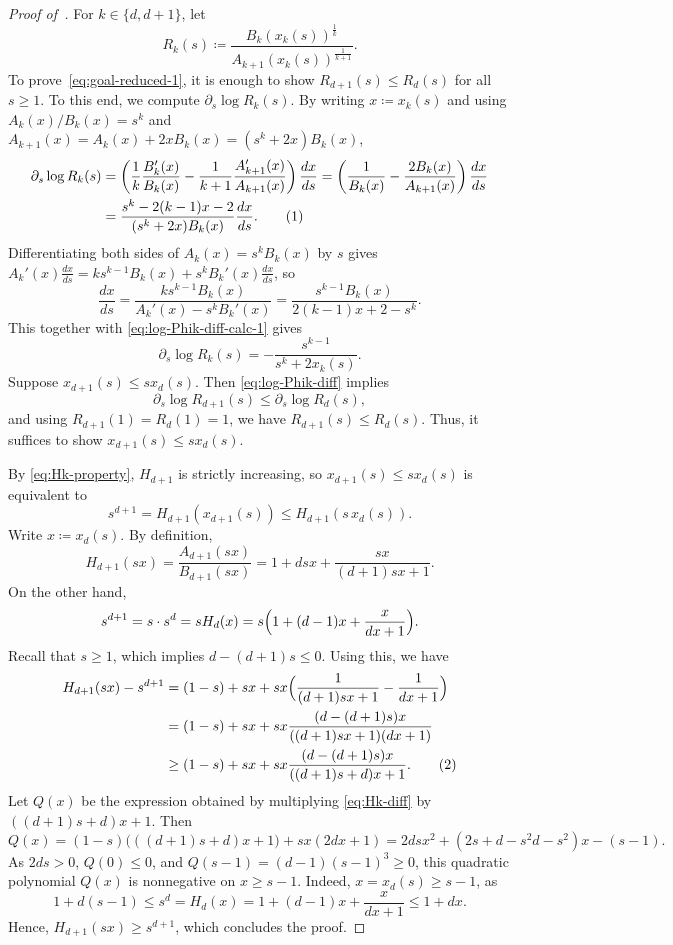 \documentclass{article}
\numberwithin{equation}{section}
\newcommand\numberthis{\addtocounter{equation}{1}\tag{\theequation}}
\theoremstyle{plain}
\theoremstyle{definition}
\theoremstyle{remark} %
\newcommand{\defeq}{\coloneqq}
\begin{document}
\begin{proof}[Proof of~]
For \(k\in\{d,d+1\}\), let
\[
    R_k(s) \defeq \frac{B_k(x_k(s))^{\frac{1}{k}}}{A_{k+1}(x_k(s))^{\frac{1}{k+1}}}.
\]
To prove~\eqref{eq:goal-reduced-1}, it is enough to show \(R_{d+1}(s)\le  R_{d}(s)\) for all \(s\ge1\). To this end, we compute $\partial_s \log R_{k}(s)$.
By writing \(x\defeq x_k(s)\) and using \(A_k(x)/B_k(x) = s^k\) and \(A_{k+1}(x) = A_k(x) + 2x B_k(x)=(s^k + 2x)B_k(x)\),
\begin{align*}
    \partial_s \log R_k(s)
    &= \left(\frac{1}{k} \frac{B_k'(x)}{B_k(x)} - \frac{1}{k+1} \frac{A_{k+1}'(x)}{A_{k+1}(x)}\right)\frac{dx}{ds}
    = \left(  \frac{1}{B_k(x)}  - \frac{2B_k(x)}{A_{k+1}(x)} \right)\frac{dx}{ds}
    \\&= \frac{s^k - 2(k-1)x - 2}{(s^k+2x) B_k(x)}\frac{dx}{ds}.
    \numberthis\label{eq:log-Phik-diff-calc-1}
\end{align*}
Differentiating both sides of \(A_k(x) = s^k B_k(x)\) by $s$ gives $A_k'(x)\frac{dx}{ds}= ks^{k-1} B_k(x) + s^k B_k'(x)\frac{dx}{ds}$, so
\[
    \frac{dx}{ds} = \frac{ks^{k-1} B_k(x)}{A_k'(x) - s^k B_k'(x)} = \frac{s^{k-1} B_k(x)}{2(k-1)x + 2 - s^k}.
\]
This together with \eqref{eq:log-Phik-diff-calc-1} gives 
\begin{equation}\label{eq:log-Phik-diff}
    \partial_s \log R_{k}(s)
    = -\frac{s^{k-1}}{s^{k}+2x_{k}(s)}.
\end{equation}
Suppose \(x_{d+1}(s) \le s x_{d}(s)\). Then \eqref{eq:log-Phik-diff} implies
\[
    \partial_s \log R_{d+1}(s) \le \partial_s \log R_{d}(s),
\]
and using \(R_{d+1}(1) = R_{d}(1) = 1\), we have \(R_{d+1}(s) \le R_{d}(s)\). Thus, it suffices to show \(x_{d+1}(s)\le s x_{d}(s)\).

\medskip

By \eqref{eq:Hk-property}, \(H_{d+1}\) is strictly increasing, so \(x_{d+1}(s)\le s x_{d}(s)\) is equivalent to
\[
    s^{d+1} = H_{d+1}(x_{d+1}(s)) \le H_{d+1}(s\, x_{d}(s)).
\]
Write \(x \defeq x_{d}(s)\). By definition,
\[
    H_{d+1}(sx) = \frac{A_{d+1}(sx)}{B_{d+1}(sx)} = 1 + dsx + \frac{sx}{(d+1)sx+1}.
\]
On the other hand,
\[
    s^{d+1} = s\cdot s^{d} = s H_{d}(x) = s \Bigl( 1 + (d-1)x + \frac{x}{dx+1} \Bigr).
\]
Recall that $s\geq 1$, which implies \(d - (d+1)s \le 0\). Using this, we have
\begin{align*}
    H_{d+1}(sx) - s^{d+1}
    &= (1-s) + sx + sx \Bigl( \frac{1}{(d+1)sx+1} - \frac{1}{dx+1} \Bigr)
    \\&= (1-s) + sx + sx \frac{(d - (d+1)s)x}{((d+1)sx+1)(dx+1)}
    \\&\ge (1-s) + sx + sx \frac{(d - (d+1)s)x}{((d+1)s + d)x + 1}.
    \numberthis\label{eq:Hk-diff}
\end{align*}
 Let \(Q(x)\) be the expression obtained by multiplying \eqref{eq:Hk-diff} by \(((d+1)s + d)x+1\). Then
\[
    Q(x) = (1-s)\big(((d+1)s +d)x +1\big) + sx(2dx+1) =
    2dsx^2 + ( 2s +d -s^2d -s^2 )x - (s-1).
\]
As $2ds>0$, \(Q(0)\le 0\), and \(Q(s-1)=(d-1)(s-1)^3\ge0\), this quadratic polynomial $Q(x)$ is nonnegative on \(x\ge s-1\). Indeed, $x=x_d(s)\geq s-1$, as
\[
    1 + d(s-1) \le s^{d} = H_{d}(x) = 1 + (d-1)x + \frac{x}{dx+1} \le 1 + dx.
\]
Hence, \(H_{d+1}(sx) \ge s^{d+1}\), which concludes the proof.
\end{proof}
\end{document}
